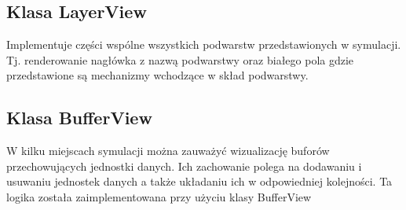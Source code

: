 \subsection{Klasa LayerView}

Implementuje części wspólne wszystkich podwarstw przedstawionych w symulacji. Tj. renderowanie nagłówka z nazwą podwarstwy oraz białego pola gdzie przedstawione są mechanizmy wchodzące w skład podwarstwy.

\subsection{Klasa BufferView}

W kilku miejscach symulacji można zauważyć wizualizację buforów przechowujących jednostki danych. Ich zachowanie polega na dodawaniu i usuwaniu jednostek danych a także układaniu ich w odpowiedniej kolejności. Ta logika została zaimplementowana przy użyciu klasy BufferView